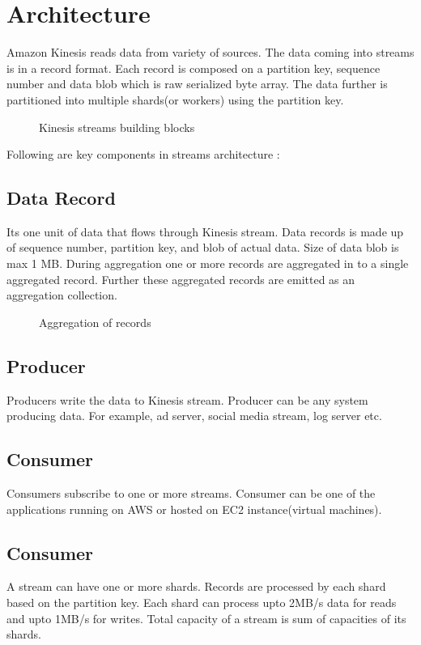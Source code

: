 \documentclass[9pt,twocolumn,twoside]{../../styles/osajnl}
\begin{document}
\section{Architecture}
Amazon Kinesis reads data from variety of sources. The data coming into streams
is in a record format. Each record is composed on a partition key, sequence
number and data blob which is raw serialized byte array. The data further is
partitioned into multiple shards(or workers) using the partition key.
\begin{figure}[htbp]
\centering
{}
\caption{Kinesis streams building blocks \cite{www-kinesis-arch}}
\label{fig:false-color}
\end{figure}

Following are key components in streams architecture \cite{www-kinesis-arch} :

\subsection{Data Record}
Its one unit of data that flows through Kinesis stream. Data records is made up
of sequence number, partition key, and blob of actual data. Size of data blob is
max 1 MB. During aggregation one or more records are aggregated in to a single
aggregated record. Further these aggregated records are emitted as an
aggregation collection.

\begin{figure}[htbp]
\centering
{}
\caption{Aggregation of records}
\label{fig:false-color}
\end{figure}

\subsection{Producer}
Producers write the data to Kinesis stream. Producer can be any system producing
data. For example, ad server, social media stream, log server etc.

\subsection{Consumer}
Consumers subscribe to one or more streams.  Consumer can be one of the
applications  running on AWS or hosted on EC2 \CE instance(virtual machines).

\subsection{Consumer}
A stream can have one or more shards. Records are processed by each shard based
on the partition key. Each shard can process upto \SE 2MB/s data for reads
and upto \SE
1MB/s for writes. Total capacity of a stream is sum of capacities of its shards.
\end{document}
